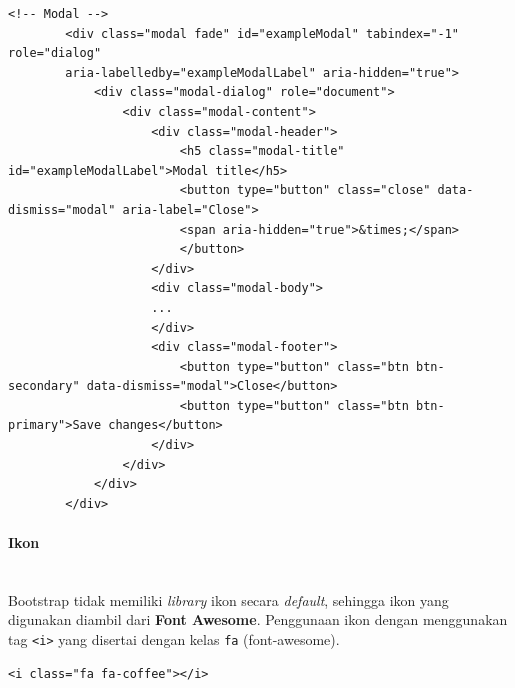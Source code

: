\documentclass[a4paper,twoside]{article}
\newcommand{\myparagraph}[1]{\paragraph{#1}\mbox{}\\}
\begin{document}
\begin{enumerate}
\begin{lstlisting}[frame=single, basicstyle=\tiny]
		<!-- Modal -->
		<div class="modal fade" id="exampleModal" tabindex="-1" role="dialog" 
		aria-labelledby="exampleModalLabel" aria-hidden="true">
			<div class="modal-dialog" role="document">
				<div class="modal-content">
					<div class="modal-header">
						<h5 class="modal-title" id="exampleModalLabel">Modal title</h5>
						<button type="button" class="close" data-dismiss="modal" aria-label="Close">
						<span aria-hidden="true">&times;</span>
						</button>
					</div>
					<div class="modal-body">
					...
					</div>
					<div class="modal-footer">
						<button type="button" class="btn btn-secondary" data-dismiss="modal">Close</button>
						<button type="button" class="btn btn-primary">Save changes</button>
					</div>
				</div>
			</div>
		</div>
		\end{lstlisting}
		
		\myparagraph{Ikon}
		Bootstrap tidak memiliki \textit{library} ikon secara \textit{default}, sehingga ikon yang digunakan diambil dari \textbf{Font Awesome}. Penggunaan ikon dengan menggunakan tag \colorbox{mygray}{\texttt{<i>}} yang disertai dengan kelas \colorbox{mygray}{\texttt{fa}} (font-awesome). 
		
		\begin{lstlisting}[frame=single]
		<i class="fa fa-coffee"></i>
		\end{lstlisting}
		

\end{enumerate}
\end{document}
